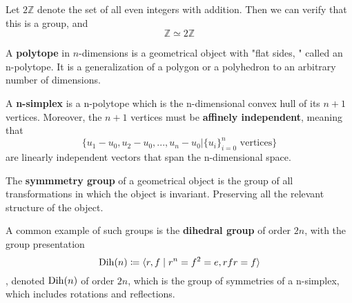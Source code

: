   \begin{example}
    Let $2 \mathbb{Z}$ denote the set of all even integers with addition. Then we can verify that this is a group, and 
    \begin{equation}
      \mathbb{Z} \simeq 2 \mathbb{Z}
    \end{equation}
  \end{example}

  \begin{definition}[Polytope]
    A \textbf{polytope} in $n$-dimensions is a geometrical object with "flat sides, " called an n-polytope. It is a generalization of a polygon or a polyhedron to an arbitrary number of dimensions. 
  \end{definition}

  \begin{definition}[Simplex]
    A \textbf{n-simplex} is a n-polytope which is the n-dimensional convex hull of its $n+1$ vertices. Moreover, the $n+1$ vertices must be \textbf{affinely independent}, meaning that
    \begin{equation}
      \{u_1 - u_0, u_2 - u_0, ..., u_n - u_0 | \{u_i\}_{i=0}^{n} \text{ vertices} \}
    \end{equation}
    are linearly independent vectors that span the n-dimensional space. 
  \end{definition}

  \begin{definition}
    The \textbf{symmmetry group} of a geometrical object is the group of all transformations in which the object is invariant. Preserving all the relevant structure of the object. 
  \end{definition}

  \begin{definition}
    A common example of such groups is the \textbf{dihedral group} of order $2n$, with the group presentation 
    \begin{equation}
      \Dih(n) \coloneqq \langle r, f \mid r^n = f^2 = e, rfr = f  \rangle
    \end{equation}
    , denoted $\Dih(n)$ of order $2n$, which is the group of symmetries of a n-simplex, which includes rotations and reflections. 
  \end{definition}


